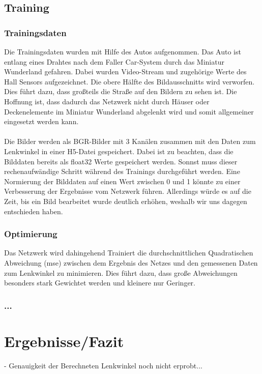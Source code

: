 \documentclass[a4paper, 12pt]{scrartcl}
\begin{document}
			\subsection{Training}
				\subsubsection{Trainingsdaten}
				Die Trainingsdaten wurden mit Hilfe des Autos aufgenommen. Das Auto ist entlang eines Drahtes nach dem Faller Car-System durch das Miniatur Wunderland gefahren. Dabei wurden Video-Stream und zugehörige Werte des Hall Sensors aufgezeichnet. Die obere Hälfte des Bildausschnitts wird verworfen. Dies führt dazu, dass großteils die Straße auf den Bildern zu sehen ist. Die Hoffnung ist, dass dadurch das Netzwerk nicht durch Häuser oder Deckenelemente im Miniatur Wunderland abgelenkt wird und somit allgemeiner eingesetzt werden kann. \\ \\
				Die Bilder werden als BGR-Bilder mit 3 Kanälen zusammen mit den Daten zum Lenkwinkel in einer H5-Datei gespeichert. Dabei ist zu beachten, dass die Bilddaten bereits als float32 Werte gespeichert werden. Sonnst muss dieser rechenaufwändige Schritt während des Trainings durchgeführt werden. Eine Normierung der Bilddaten auf einen Wert zwischen 0 und 1 könnte zu einer Verbesserung der Ergebnisse vom Netzwerk führen. Allerdings würde es auf die Zeit, bis ein Bild bearbeitet wurde deutlich erhöhen, weshalb wir uns dagegen entschieden haben.
				\subsubsection{Optimierung}
				Das Netzwerk wird dahingehend Trainiert die durchschnittlichen Quadratischen Abweichung (mse) zwischen dem Ergebnis des Netzes und den gemessenen Daten zum Lenkwinkel zu minimieren. Dies führt dazu, dass große Abweichungen besonders stark Gewichtet werden und kleinere nur Geringer. 
				\subsubsection{...}
			
	\section{Ergebnisse/Fazit}
	- Genauigkeit der Berechneten Lenkwinkel noch nicht erprobt...
\end{document}
